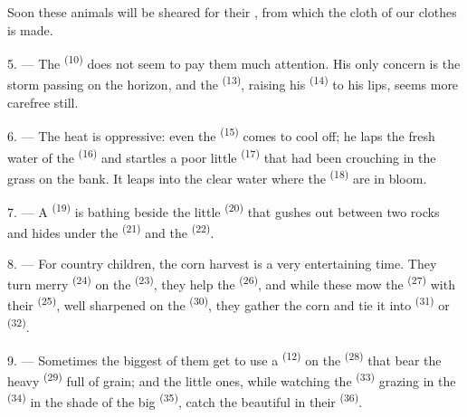 Soon these animals will be sheared for their , from which the cloth of our
clothes is made.

\VUsaut{5.0mm}
\VUsaut{3.4mm}

5. --- The  \textsuperscript{(10)} does not seem to pay them much attention.
His only concern is the storm passing on the horizon, and the
 \textsuperscript{(13)}, raising his  \textsuperscript{(14)}
to his lips, seems more carefree still.

6. --- The heat is oppressive: even the  \textsuperscript{(15)} comes to cool off;
he laps the fresh water of the  \textsuperscript{(16)} and startles a poor
little  \textsuperscript{(17)} that had been crouching in the grass on the bank.
It leaps into the clear water where the  \textsuperscript{(18)} are in
bloom.

7. --- A  \textsuperscript{(19)} is bathing beside the little
 \textsuperscript{(20)} that gushes out between two rocks and hides
under the  \textsuperscript{(21)} and the
 \textsuperscript{(22)}.

\VUsaut{5.0mm}
\VUsaut{3.4mm}

8. --- For country children, the corn harvest is a very entertaining time. They turn merry
 \textsuperscript{(24)} on the
 \textsuperscript{(23)}, they help the 
\textsuperscript{(26)}, and while these mow the  \textsuperscript{(27)} with
their  \textsuperscript{(25)}, well sharpened on the
 \textsuperscript{(30)}, they gather the corn and tie it into
 \textsuperscript{(31)} or  \textsuperscript{(32)}.

9. --- Sometimes the biggest of them get to use a
 \textsuperscript{(12)} on the  \textsuperscript{(28)}
that bear the heavy  \textsuperscript{(29)} full of grain; and the little ones,
while watching the  \textsuperscript{(33)} grazing in the 
\textsuperscript{(34)} in the shade of the big  \textsuperscript{(35)},
catch the beautiful  in their
 \textsuperscript{(36)}.

